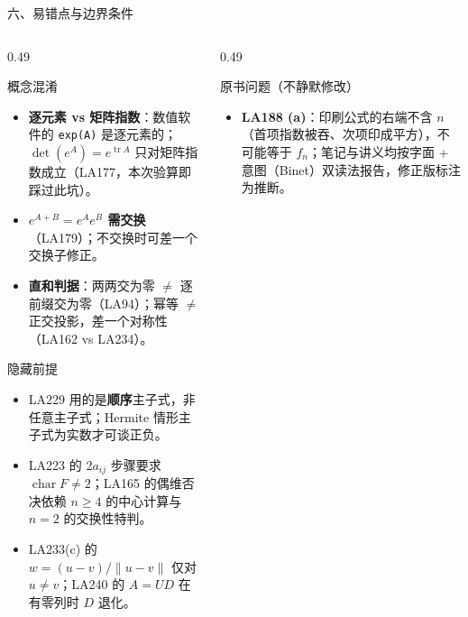 \documentclass[aspectratio=169,10pt,fontset=none]{ctexbeamer}
\begin{document}
\begin{frame}[t]{六、易错点与边界条件}
  \begin{columns}[T,onlytextwidth]
    \begin{column}{0.49\textwidth}
      \begin{alertblock}{\footnotesize 概念混淆}
        \scriptsize
        \begin{itemize}\setlength{\itemsep}{1pt}
          \item \textbf{逐元素 vs 矩阵指数}：数值软件的 \texttt{exp(A)} 是逐元素的；$\det(e^A)=e^{\operatorname{tr}A}$ 只对矩阵指数成立（LA177，本次验算即踩过此坑）。
          \item \textbf{$e^{A+B}=e^Ae^B$ 需交换}（LA179）；不交换时可差一个交换子修正。
          \item \textbf{直和判据}：两两交为零 $\ne$ 逐前缀交为零（LA94）；幂等 $\ne$ 正交投影，差一个对称性（LA162 vs LA234）。
        \end{itemize}
      \end{alertblock}
      \begin{alertblock}{\footnotesize 隐藏前提}
        \scriptsize
        \begin{itemize}\setlength{\itemsep}{1pt}
          \item LA229 用的是\textbf{顺序}主子式，非任意主子式；Hermite 情形主子式为实数才可谈正负。
          \item LA223 的 $2a_{ij}$ 步骤要求 $\operatorname{char}F\ne2$；LA165 的偶维否决依赖 $n\ge4$ 的中心计算与 $n=2$ 的交换性特判。
          \item LA233(c) 的 $w=(u{-}v)/\lVert u{-}v\rVert$ 仅对 $u\ne v$；LA240 的 $A=UD$ 在有零列时 $D$ 退化。
        \end{itemize}
      \end{alertblock}
    \end{column}
    \begin{column}{0.49\textwidth}
      \begin{alertblock}{\footnotesize 原书问题（不静默修改）}
        \scriptsize
        \begin{itemize}\setlength{\itemsep}{1pt}
          \item \textbf{LA188 (a)}：印刷公式的右端不含 $n$（首项指数被吞、次项印成平方），不可能等于 $f_n$；笔记与讲义均按字面 + 意图（Binet）双读法报告，修正版标注为推断。
        \end{itemize}
      \end{alertblock}

\end{column}
\end{columns}
\end{frame}
\end{document}
